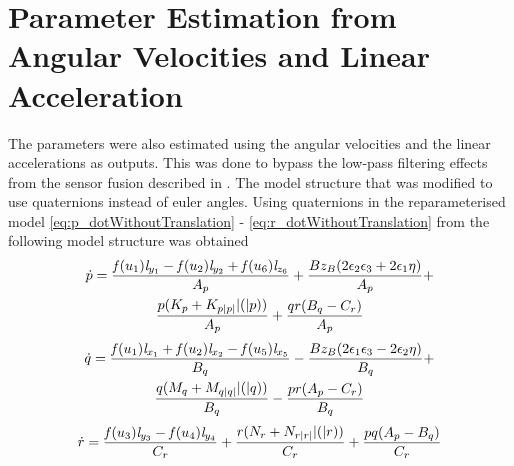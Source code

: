\section{Parameter Estimation from Angular Velocities and Linear Acceleration}
The parameters were also estimated using the angular velocities and the linear accelerations as outputs. This was done to bypass the low-pass filtering effects from the sensor fusion described in . The model structure that was modified to use quaternions instead of euler angles. Using quaternions in the reparameterised model \eqref{eq:p_dotWithoutTranslation} - \eqref{eq:r_dotWithoutTranslation} from  the following model structure was obtained
\begin{multline}
\dot{p} = \frac{\mathit{f}(u_{1}) \mathit{l}_{y_{1}} - \mathit{f}(u_{2}) \mathit{l}_{y_{2}} + \mathit{f}(u_{6}) \mathit{l}_{z_{6}}}{A_p} + \frac{B z_B (2 \epsilon_2 \epsilon_3 + 2 \epsilon_1 \eta)}{A_p} + \\ \frac{p (K_{p} + K_{p|p|} |(|p))}{A_p} + \frac{q r (B_q - C_r)}{A_p}
\end{multline}
\begin{multline}
\dot{q} = \frac{\mathit{f}(u_{1}) \mathit{l}_{x_{1}} + \mathit{f}(u_{2}) \mathit{l}_{x_{2}} - \mathit{f}(u_{5}) \mathit{l}_{x_{5}}}{B_q} - \frac{B z_B (2 \epsilon_1 \epsilon_3 - 2 \epsilon_2 \eta)}{B_q} + \\ \frac{q (M_{q} + M_{q|q|} |(|q))}{B_q} - \frac{p r (A_p - C_r)}{B_q}
\end{multline}
\begin{multline}
\dot{r} = \frac{\mathit{f}(u_{3}) \mathit{l}_{y_{3}} - \mathit{f}(u_{4}) \mathit{l}_{y_{4}}}{C_r} + \frac{r (N_{r} + N_{r|r|} |(|r))}{C_r} + \frac{p q (A_p  - B_q)}{C_r}
\end{multline}

